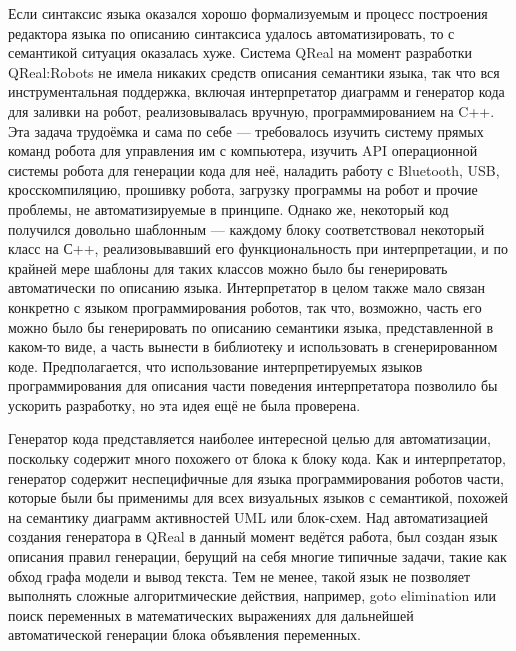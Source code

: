 \documentclass[a4paper]{article}
\begin{document}
Если синтаксис языка оказался хорошо формализуемым и процесс построения редактора языка по описанию синтаксиса удалось автоматизировать, то с семантикой ситуация оказалась хуже. Система QReal на момент разработки QReal:Robots не имела никаких средств описания семантики языка, так что вся инструментальная поддержка, включая интерпретатор диаграмм и генератор кода для заливки на робот, реализовывалась вручную, программированием на C++. Эта задача трудоёмка и сама по себе --- требовалось изучить систему прямых команд робота для управления им с компьютера, изучить API операционной системы робота для генерации кода для неё, наладить работу с Bluetooth, USB, кросскомпиляцию, прошивку робота, загрузку программы на робот и прочие проблемы, не автоматизируемые в принципе. Однако же, некоторый код получился довольно шаблонным --- каждому блоку соответствовал некоторый класс на С++, реализовывавший его функциональность при интерпретации, и по крайней мере шаблоны для таких классов можно было бы генерировать автоматически по описанию языка. Интерпретатор в целом также мало связан конкретно с языком программирования роботов, так что, возможно, часть его можно было бы генерировать по описанию семантики языка, представленной в каком-то виде, а часть вынести в библиотеку и использовать в сгенерированном коде. Предполагается, что использование интерпретируемых языков программирования для описания части поведения интерпретатора позволило бы ускорить разработку, но эта идея ещё не была проверена.

Генератор кода представляется наиболее интересной целью для автоматизации, поскольку содержит много похожего от блока к блоку кода. Как и интерпретатор, генератор содержит неспецифичные для языка программирования роботов части, которые были бы применимы для всех визуальных языков с семантикой, похожей на семантику диаграмм активностей UML или блок-схем. Над автоматизацией создания генератора в QReal в данный момент ведётся работа, был создан язык описания правил генерации, берущий на себя многие типичные задачи, такие как обход графа модели и вывод текста. Тем не менее, такой язык не позволяет выполнять сложные алгоритмические действия, например, goto elimination или поиск переменных в математических выражениях для дальнейшей автоматической генерации блока объявления переменных.
\end{document}
